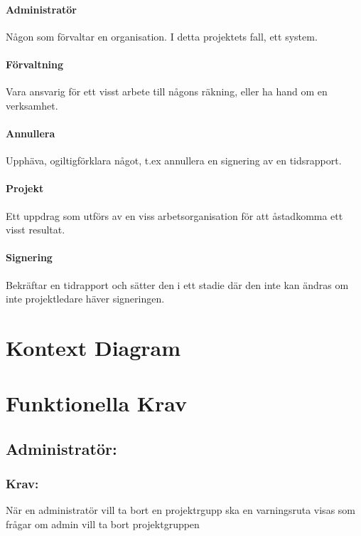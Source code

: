 \documentclass[paper=a4, fontsize=11pt,twoside]{article}
\begin{document}
	\paragraph{Administratör}
	\flushleft
	Någon som förvaltar en organisation. I detta projektets fall, ett system.
	\paragraph{Förvaltning}
	\flushleft
	Vara ansvarig för ett visst arbete till någons räkning, eller ha hand om en verksamhet.
	\paragraph{Annullera}
	\flushleft
	Upphäva, ogiltigförklara något, t.ex annullera en signering av en tidsrapport.
	\paragraph{Projekt}
	\flushleft
	Ett uppdrag som utförs av en viss arbetsorganisation för att åstadkomma ett visst resultat. 
	\paragraph{Signering}
	\flushleft
	Bekräftar en tidrapport och sätter den i ett stadie där den inte kan ändras om inte projektledare häver signeringen.
	\paragraph{}
	\section{Kontext Diagram}
	
	\section{Funktionella Krav}
	
	\subsection{Administratör:}
	\subsubsection*{Krav:}
	När en administratör vill ta bort en projektrgupp ska en varningsruta visas som frågar om admin vill ta bort projektgruppen
	
\end{document}
